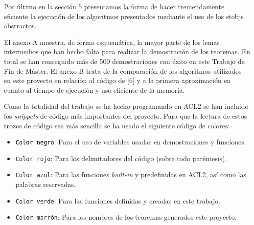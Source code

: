 \documentclass[a4paper,10pt]{article}
\begin{document}
\par\vspace{10pt}

Por último en la sección 5 presentamos la forma de hacer tremendamente eficiente la ejecución de los algoritmos presentados mediante el uso de los stobjs abstractos. 

\par\vspace{10pt}

El anexo A muestra, de forma esquemática, la mayor parte de los lemas intermedios que han hecho falta para realizar la demostración de los teoremas. En total se han conseguido más de 500 demostraciones con éxito en este Trabajo de Fin de Máster. El anexo B trata de la comparación de los algoritmos utilizados en este proyecto en relación al código de [6] y a la primera aproximación en cuanto al tiempo de ejecución y uso eficiente de la memoria.

\par\vspace{10pt}

Como la totalidad del trabajo se ha hecho programando en ACL2 se han incluido los \emph{snippets} de código más importantes del proyecto. Para que la lectura de estos trozos de código sea más sencilla se ha usado el siguiente código de colores:

\par\vspace{10pt}

\begin{itemize}
	\item \textcolor{black}{\texttt{Color negro}}: Para el uso de variables usadas en demostraciones y funciones.
	\item \textcolor{javared}{\texttt{Color rojo}}: Para los delimitadores del código (sobre todo paréntesis).
	\item \textcolor{javadocblue}{\texttt{Color azul}}: Para las funciones \emph{built-in} y predefinidas en ACL2, así como las palabras reservadas.
	\item \textcolor{javagreen}{\texttt{Color verde}}: Para las funciones definidas y creadas en este trabajo.
	\item \textcolor{javabrown}{\texttt{Color marrón}}: Para los nombres de los teoremas generados este proyecto.
\end{itemize}

\par\vspace{10pt}
\end{document}
